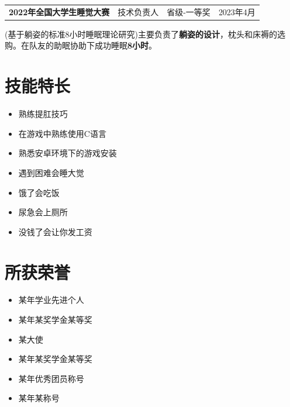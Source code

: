 \documentclass[11pt]{article}
\begin{document}
    \begin{table}[h!]
        \begin{tabularx}{\textwidth}{Xp{}p{}p{}}
            \textbf{2022年全国大学生睡觉大赛} & 技术负责人 & 省级-一等奖 & 2023年4月\\
        \end{tabularx}
    \end{table}
    \vspace{-1em}
    (基于躺姿的标准8小时睡眠理论研究)主要负责了\textbf{躺姿的设计}，枕头和床褥的选购。在队友的助眠协助下成功睡眠\textbf{8小时}。


    \section{\makebox[\widthof{\faWrench}][c]{\color{NPU_Blue}{\faWrench}}\quad 技能特长}
    \vspace{0.5em}          %
    \begin{itemize}
        \item 熟练提肛技巧
        \item 在游戏中熟练使用C语言
        \item 熟悉安卓环境下的游戏安装
        \item 遇到困难会睡大觉
        \item 饿了会吃饭
        \item 尿急会上厕所
        \item 没钱了会让你发工资
    \end{itemize}


    \newpage


    \section{\makebox[\widthof{\faStar}][c]{\color{NPU_Blue}{\faStar}}\quad 所获荣誉}
    \vspace{-1em}           %
    \begin{multicols}{2}
        \begin{itemize}
            \item 某年学业先进个人
            \item 某年某奖学金某等奖
            \item 某大使
            \item 某年某奖学金某等奖
            \item 某年优秀团员称号
            \item 某年某称号
        \end{itemize}
    \end{multicols}
\end{document}

